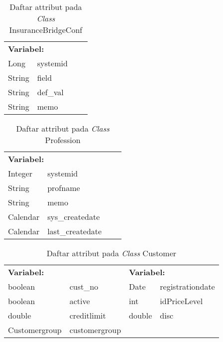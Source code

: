 \begin{table}[H]
	\caption{Daftar attribut pada \textit{Class} InsuranceBridgeConf}
	\centering
	\small
	\begin{adjustbox}{width=1\textwidth}	
		\begin{tabular}{|p{5cm} p{3.1cm} p{2cm} p{2.1cm}|}
			\hline
			\multicolumn{2}{|l}{\textbf{Variabel:}}&\multicolumn{2}{l|}{\textbf{}}\\
			Long&systemid&&\\
			String&field&&\\
			String&def\_val&&\\
			String&memo&&\\
			\hline
		\end{tabular}
	\end{adjustbox}
\end{table}
\begin{table}[H]
	\caption{Daftar attribut pada \textit{Class} Profession}
	\centering
	\small
	\begin{adjustbox}{width=1\textwidth}	
		\begin{tabular}{|p{5cm} p{3.1cm} p{2cm} p{2.1cm}|}
			\hline
			\multicolumn{2}{|l}{\textbf{Variabel:}}&\multicolumn{2}{l|}{\textbf{}}\\
			Integer&systemid&&\\
			String&profname&&\\
			String&memo&&\\
			Calendar&sys\_createdate&&\\
			Calendar&last\_createdate&&\\
			\hline
		\end{tabular}
	\end{adjustbox}
\end{table}
\begin{table}[H]
	\caption{Daftar attribut pada \textit{Class} Customer}
	\centering
	\small
	\begin{adjustbox}{width=1\textwidth}	
		\begin{tabular}{|p{4cm} p{2.1cm} p{3cm} p{3.1cm}|}
			\hline
			\multicolumn{2}{|l}{\textbf{Variabel:}}&\multicolumn{2}{l|}{\textbf{Variabel:}}\\
			boolean&cust\_no&Date&registrationdate\\
			boolean&active&int&idPriceLevel\\
			double&creditlimit&double&disc\\
			Customergroup&customergroup&&\\
			\hline
		\end{tabular}
	\end{adjustbox}
\end{table}

